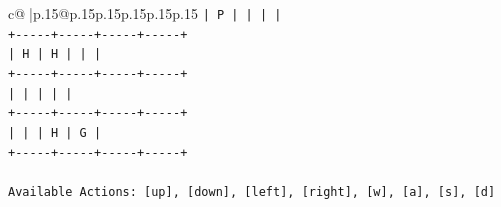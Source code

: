 \documentclass{article}
\begin{document}
{\begin{supertabular}{c@{$\;$}|p{.15\linewidth}@{}p{.15\linewidth}p{.15\linewidth}p{.15\linewidth}p{.15\linewidth}p{.15\linewidth}}
{{{\texttt{|  P  |     |     |     |} \\
\texttt{+{-}{-}{-}{-}{-}+{-}{-}{-}{-}{-}+{-}{-}{-}{-}{-}+{-}{-}{-}{-}{-}+} \\
\texttt{|  H  |  H  |     |     |} \\
\texttt{+{-}{-}{-}{-}{-}+{-}{-}{-}{-}{-}+{-}{-}{-}{-}{-}+{-}{-}{-}{-}{-}+} \\
\texttt{|     |     |     |     |} \\
\texttt{+{-}{-}{-}{-}{-}+{-}{-}{-}{-}{-}+{-}{-}{-}{-}{-}+{-}{-}{-}{-}{-}+} \\
\texttt{|     |     |  H  |  G  |} \\
\texttt{+{-}{-}{-}{-}{-}+{-}{-}{-}{-}{-}+{-}{-}{-}{-}{-}+{-}{-}{-}{-}{-}+} \\
\\ 
\texttt{Available Actions: {[}up{]}, {[}down{]}, {[}left{]}, {[}right{]}, {[}w{]}, {[}a{]}, {[}s{]}, {[}d{]}} \\
            }
        }
    }
     \\ \\


\end{supertabular}}
\end{document}
